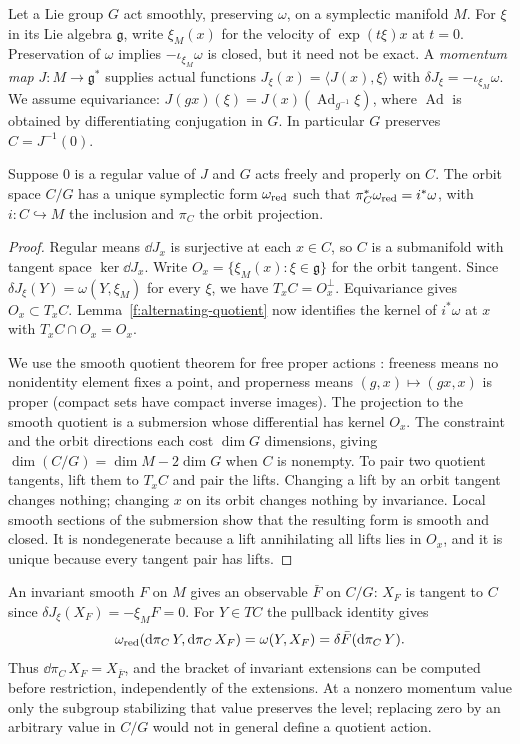 Let a Lie group $G$ act smoothly, preserving $\omega$, on a symplectic manifold $M$. For $\xi$ in its Lie algebra $\mathfrak g$, write $\xi_M(x)$ for the velocity of $\exp(t\xi)x$ at $t=0$. Preservation of $\omega$ implies $-\iota_{\xi_M}\omega$ is closed, but it need not be exact. A \emph{momentum map} $J:M\to\mathfrak g^*$ supplies actual functions $J_\xi(x)=\langle J(x),\xi\rangle$ with $\delta J_\xi=-\iota_{\xi_M}\omega$. We assume equivariance: $J(gx)(\xi)=J(x)(\operatorname{Ad}_{g^{-1}}\xi)$, where $\operatorname{Ad}$ is obtained by differentiating conjugation in $G$. In particular $G$ preserves $C=J^{-1}(0)$.

\begin{theorem}\label{f:regular-reduction}
Suppose $0$ is a regular value of $J$ and $G$ acts freely and properly on $C$. The orbit space $C/G$ has a unique symplectic form $\omega_{\rm red}$ such that $\pi_C^*\omega_{\rm red}=i^*\omega$, with $i:C\hookrightarrow M$ the inclusion and $\pi_C$ the orbit projection.
\end{theorem}
\begin{proof}
Regular means $\dd J_x$ is surjective at each $x\in C$, so $C$ is a submanifold with tangent space $\ker\dd J_x$. Write $O_x=\{\xi_M(x):\xi\in\mathfrak g\}$ for the orbit tangent. Since $\delta J_\xi(Y)=\omega(Y,\xi_M)$ for every $\xi$, we have $T_xC=O_x^\perp$. Equivariance gives $O_x\subset T_xC$. Lemma~\ref{f:alternating-quotient} now identifies the kernel of $i^*\omega$ at $x$ with $T_xC\cap O_x=O_x$.

We use the smooth quotient theorem for free proper actions \cite{Marsden}: freeness means no nonidentity element fixes a point, and properness means $(g,x)\mapsto(gx,x)$ is proper (compact sets have compact inverse images). The projection to the smooth quotient is a submersion whose differential has kernel $O_x$. The constraint and the orbit directions each cost $\dim G$ dimensions, giving $\dim(C/G)=\dim M-2\dim G$ when $C$ is nonempty. To pair two quotient tangents, lift them to $T_xC$ and pair the lifts. Changing a lift by an orbit tangent changes nothing; changing $x$ on its orbit changes nothing by invariance. Local smooth sections of the submersion show that the resulting form is smooth and closed. It is nondegenerate because a lift annihilating all lifts lies in $O_x$, and it is unique because every tangent pair has lifts.
\end{proof}
An invariant smooth $F$ on $M$ gives an observable $\bar F$ on $C/G$: $X_F$ is tangent to $C$ since $\delta J_\xi(X_F)=-\xi_M F=0$. For $Y\in TC$ the pullback identity gives
\[
 \omega_{\rm red}(\mathrm{d}\pi_C\,Y,\mathrm{d}\pi_C\,X_F)=\omega(Y,X_F)
                  =\delta\bar F(\mathrm{d}\pi_C\,Y).
\]
Thus $\dd\pi_C\,X_F=X_{\bar F}$, and the bracket of invariant extensions can be computed before restriction, independently of the extensions. At a nonzero momentum value only the subgroup stabilizing that value preserves the level; replacing zero by an arbitrary value in $C/G$ would not in general define a quotient action.

